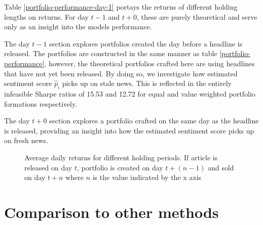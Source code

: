 Table \ref{portfolio-performance-day-1} portays the returns of different holding lengths on returns. For day $t-1$ and $t+0$, these are purely theoretical and serve only as an insight into the models performance. 

The day $t-1$ section explores portfolios created the day before a headline is released. The portfolios are constructed in the same manner as table \ref{portfolio-performance}, however, the theoretical portfolios crafted here are using headlines that have not yet been released. By doing so, we investigate how estimated sentiment score $\widehat p_i$ picks up on stale news. This is reflected in the entirely infeasible Sharpe ratios of 15.53 and 12.72 for equal and value weighted portfolio formations respectively. 

The day $t + 0$ section explores a portfolio crafted on the same day as the headline is released, providing an insight into how the estimated sentiment score picks up on fresh news. 
\begin{figure}[!ht]
      \centering
{}
\label{speed-assimilation}
\caption[Graph of average daily returns for different holding periods]{Average daily returns for different holding periods. If article is released on day $t$, portfolio is created on day $t+(n-1)$ and sold on day $t+n$ where $n$ is the value indicated by the x axis}
\end{figure}


\section{Comparison to other methods}

